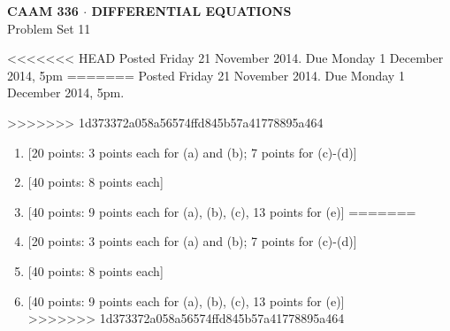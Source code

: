 \documentclass[10pt]{article}
\begin{document}
\begin{center}
\large \textsf{\textbf{CAAM 336 $\cdot$ DIFFERENTIAL EQUATIONS}\\[0.5em]
 Problem Set 11 }
\end{center}

<<<<<<< HEAD
Posted Friday 21 November 2014. Due Monday 1 December 2014, 5pm
=======
Posted Friday 21 November 2014.  Due Monday 1 December 2014, 5pm.

>>>>>>> 1d373372a058a56574ffd845b57a41778895a464


\begin{enumerate}

<<<<<<< HEAD
\vspace*{1em}
\item {[20 points: 3 points each for (a) and (b); 7 points for (c)-(d)]}\\ 

\newpage
\item {[40 points: 8 points each]} \\ 

\newpage
\item {[40 points: 9 points each for (a), (b), (c), 13 points for (e)]} 
=======
\item {[20 points: 3 points each for (a) and (b); 7 points for (c)-(d)]}\\ 


\newpage
\item {[40 points: 8 points each]}\\ 

\newpage
\item {[40 points: 9 points each for (a), (b), (c), 13 points for (e)]}\\  


>>>>>>> 1d373372a058a56574ffd845b57a41778895a464


\end{enumerate}
\end{document}
